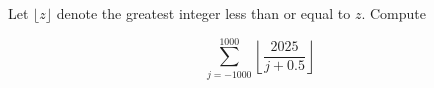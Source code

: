 Let $\lfloor z\rfloor$ denote the greatest integer less than or equal to $z$. Compute

$$
\sum_{j=-1000}^{1000}\left\lfloor\frac{2025}{j+0.5}\right\rfloor
$$